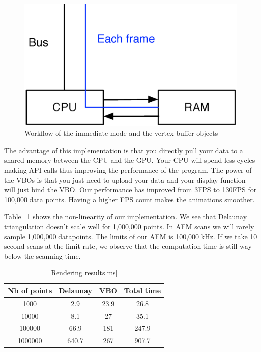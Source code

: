 \begin{figure}[H]
  \centering
  \includegraphics[scale=0.4]{images/openglVBO.eps}
    \caption{Workflow of the immediate mode and the vertex buffer objects}
  \label{openglVBO}
\end{figure}


The advantage of this implementation is that you directly pull your data to a shared memory between the CPU and the GPU. Your CPU will spend less cycles making API calls thus improving the performance of the program. The power of the VBOs is that you just need to upload your data and your display function will just bind the VBO. Our performance has improved from 3FPS to 130FPS for 100,000 data points. Having a higher FPS count makes the animations smoother.

Table  ~\ref{table:nonlin} shows the non-linearity of our implementation. We see that Delaunay triangulation doesn't scale well for 1,000,000 points. In AFM scans we will rarely sample 1,000,000 datapoints. The limits of our AFM is 100,000 kHz. If we take 10 second scans at the limit rate, we observe that the computation time is still way below the scanning time. 

\begin{table}[ht]
\caption{Rendering results[ms]} %
\centering %
\begin{tabular}{c |c c| c } %
\hline\hline %
 Nb of points & Delaunay & VBO & Total time\\ [0.5ex] %
\hline %

1000 & 2.9 & 23.9 & 26.8 \\
10000 & 8.1	&	27 	& 35.1\\
100000 & 66.9 & 181 & 247.9 \\
1000000 & 640.7	& 267 & 907.7\\[1ex]


\hline %
\end{tabular}
\label{table:nonlin} %
\end{table}


